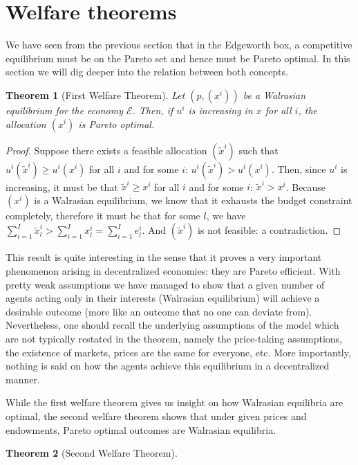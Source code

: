 \documentclass[12pt]{report}
\newtheorem{theorem}{Theorem}[chapter]
\begin{document}
\section{Welfare theorems}

We have seen from the previous section that in the Edgeworth box, a competitive equilibrium must be on the Pareto set and hence must be Pareto optimal. In this section we will dig deeper into the relation between both concepts.

\begin{theorem}[First Welfare Theorem]
Let $(p, (x^i))$ be a Walrasian equilibrium for the economy $\mathcal{E}$. Then, if $u^i$ is increasing in $x$ for all $i$, the allocation $(x^i)$ is Pareto optimal.
\end{theorem}
\begin{proof}
Suppose there exists a feasible allocation $(\tilde x^i)$ such that $u^i(\tilde x^i) \geq u^i(x^i)$ for all $i$ and for some $i$: $u^i(\tilde x^i) > u^i(x^i)$. Then, since $u^i$ is increasing, it must be that $\tilde x^i \geq x^i$ for all $i$ and for some $i$: $\tilde x^i > x^i$. Because $(x^i)$ is a Walrasian equilibrium, we know that it exhausts the budget constraint completely, therefore it must be that for some $l$, we have $\sum_{i = 1}^{I} \tilde x_l^i > \sum_{i = 1}^{I} x_l^i = \sum_{i = 1}^{I} e_l^i $. And $(\tilde x^i)$ is not feasible: a contradiction.
\end{proof}

This result is quite interesting in the sense that it proves a very important phenomenon arising in decentralized economies: they are Pareto efficient. With pretty weak assumptions we have managed to show that a given number of agents acting only in their interests (Walrasian equilibrium) will achieve a desirable outcome (more like an outcome that no one can deviate from). Nevertheless, one should recall the underlying assumptions of the model which are not typically restated in the theorem, namely the price-taking assumptions, the existence of markets, prices are the same for everyone, etc. More importantly, nothing is said on how the agents achieve this equilibrium in a decentralized manner.

While the first welfare theorem gives us insight on how Walrasian equilibria are optimal, the second welfare theorem shows that under given prices and endowments, Pareto optimal outcomes are Walrasian equilibria.

\begin{theorem}[Second Welfare Theorem]
\end{theorem}
\end{document}
